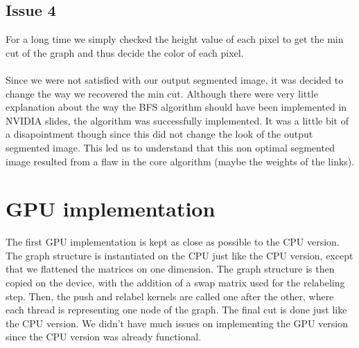 \documentclass{article}
\begin{document}
\subsection{Issue 4}

For a long time we simply checked the height value of each pixel to get the min cut of the graph and thus decide the color of each pixel.\\
\\
Since we were not satisfied with our output segmented image, it was decided to change the way we recovered the min cut. Although there were very little explanation about the way the BFS algorithm should have been implemented in NVIDIA slides, the algorithm was successfully implemented. It was a little bit of a disapointment though since this did not change the look of the output segmented image. This led us to understand that this non optimal segmented image resulted from a flaw in the core algorithm (maybe the weights of the links).

\section{GPU implementation}
The first GPU implementation is kept as close as possible to the CPU version. The graph structure is instantiated on the CPU just like the CPU version, except that we flattened the matrices on one dimension. The graph structure is then copied on the device, with the addition of a swap matrix used for the relabeling step. Then, the push and relabel kernels are called one after the other, where each thread is representing one node of the graph. The final cut is done just like the CPU version. We didn't have much issues on implementing the GPU version since the CPU version was already functional.
\end{document}
